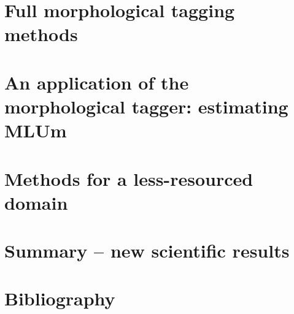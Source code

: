 \documentclass[a4paper,11pt,oneside,times,numbered,custommargin,custombib,PageStyleII]{Classes/PhDThesisPSnPDF}
\begin{document}

\chapter{Full morphological tagging methods}


\chapter{An application of the morphological tagger: estimating MLUm}


\chapter{Methods for a less-resourced domain}


\chapter{Summary -- new scientific results}


\chapter*{Bibliography}



\end{document}

